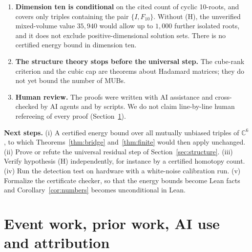 \documentclass[11pt]{article}
\newcommand{\C}{\mathbb{C}}
\theoremstyle{definition}
\theoremstyle{remark}
\begin{document}
\begin{enumerate}[leftmargin=1.6em]
detection at $0.1\%$ false alarm, where the large-sample rule and simulation suggest about $239$ for the same two
error levels. The rule of thumb is an approximation,
not a theorem. Mixed states can have small energy; Proposition~\ref{prop:purity} bounds how pure such a state can
be, but not tightly. No hardware run was performed; the repository contains only a rehearsal on a simulated noise
model, which is not evidence.
\item \textbf{Dimension ten is conditional} on the cited count of cyclic 10-roots, and covers only triples
containing the pair $\{I,F_{10}\}$. Without (H), the unverified mixed-volume value $35{,}940$ would allow up to
$1{,}000$ further isolated roots, and it does not exclude positive-dimensional solution sets.
There is no certified energy bound in dimension ten.
\item \textbf{The structure theory stops before the universal step.} The cube-rank criterion and the cubic cap
are theorems about Hadamard matrices; they do not yet bound the number of MUBs.
\item \textbf{Human review.} The proofs were written with AI assistance and cross-checked by AI agents and by
scripts. We do not claim line-by-line human refereeing of every proof (Section~\ref{sec:event}).
\end{enumerate}

\noindent\textbf{Next steps.} (i) A certified energy bound over all mutually unbiased triples of $\C^6$, to which
Theorems~\ref{thm:bridge} and~\ref{thm:finite} would then apply unchanged. (ii) Prove or refute the universal
residual step of Section~\ref{sec:structure}. (iii) Verify hypothesis (H) independently, for instance by a
certified homotopy count. (iv) Run the detection test on hardware with a white-noise calibration run.
(v) Formalize the certificate checker, so that the energy bounds become Lean facts and Corollary~\ref{cor:numbers} becomes unconditional in Lean.

\section{Event work, prior work, AI use and attribution}\label{sec:event}
\end{document}
